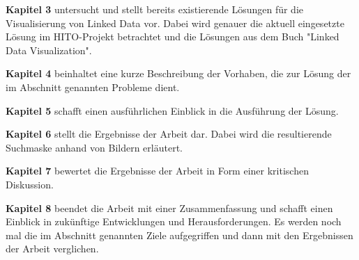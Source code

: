 \textbf{Kapitel 3} untersucht und stellt bereits existierende Lösungen für die Visualisierung von Linked Data vor. Dabei wird genauer die aktuell eingesetzte Lösung im HITO-Projekt betrachtet und die Lösungen aus dem Buch "Linked Data Visualization". \newline

\textbf{Kapitel 4} beinhaltet eine kurze Beschreibung der Vorhaben, die zur Lösung der im Abschnitt  genannten Probleme dient. \newline

\textbf{Kapitel 5} schafft einen ausführlichen Einblick in die Ausführung der Lösung.  \newline

\textbf{Kapitel 6} stellt die Ergebnisse der Arbeit dar. Dabei wird die resultierende Suchmaske anhand von Bildern erläutert. \newline

\textbf{Kapitel 7} bewertet die Ergebnisse der Arbeit in Form einer kritischen Diskussion. \newline

\textbf{Kapitel 8} beendet die Arbeit mit einer Zusammenfassung und schafft einen Einblick in zukünftige Entwicklungen und Herausforderungen. Es werden noch mal die im Abschnitt  genannten Ziele aufgegriffen und dann mit den Ergebnissen der Arbeit verglichen.



